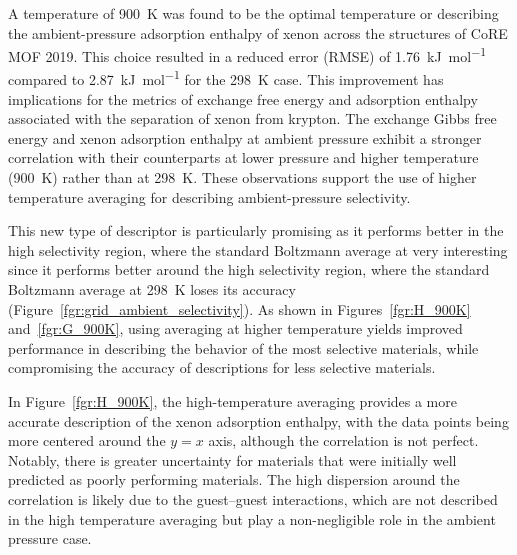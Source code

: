 \documentclass[main]{subfiles}
\begin{document}
A temperature of \SI{900}{\kelvin} was found to be the optimal temperature or describing the ambient-pressure adsorption enthalpy of xenon across the structures of CoRE MOF 2019. This choice resulted in a reduced error (RMSE) of \SI{1.76}{\kilo\joule\per\mole} compared to \SI{2.87}{\kilo\joule\per\mole} for the \SI{298}{\kelvin} case. This improvement has implications for the metrics of exchange free energy and adsorption enthalpy associated with the separation of xenon from krypton. The exchange Gibbs free energy and xenon adsorption enthalpy at ambient pressure exhibit a stronger correlation with their counterparts at lower pressure and higher temperature (\SI{900}{\kelvin}) rather than at \SI{298}{\kelvin}. These observations support the use of higher temperature averaging for describing ambient-pressure selectivity.

This new type of descriptor is particularly promising as it performs better in the high selectivity region, where the standard Boltzmann average at very interesting since it performs better around the high selectivity region, where the standard Boltzmann average at \SI{298}{\kelvin} loses its accuracy (Figure~\ref{fgr:grid_ambient_selectivity}). As shown in Figures~\ref{fgr:H_900K} and~\ref{fgr:G_900K}, using averaging at higher temperature yields improved performance in describing the behavior of the most selective materials, while compromising the accuracy of descriptions for less selective materials.

In Figure~\ref{fgr:H_900K}, the high-temperature averaging provides a more accurate description of the xenon adsorption enthalpy, with the data points being more centered around the $y=x$ axis, although the correlation is not perfect. Notably, there is greater uncertainty for materials that were initially well predicted as poorly performing materials. The high dispersion around the correlation is likely due to the guest--guest interactions, which are not described in the high temperature averaging but play a non-negligible role in the ambient pressure case.
\end{document}
